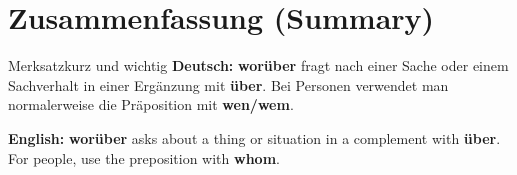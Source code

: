 \documentclass[a4paper,11pt]{article}
\newcommand{\GermanText}[1]{\textbf{Deutsch: }#1\par}
\newcommand{\EnglishText}[1]{{\small\color{SoftGray}\textbf{English: }#1\par}}
\begin{document}
\section{Zusammenfassung (Summary)}
\begin{grammarentry}{Merksatz}{kurz und wichtig}
\GermanText{\textbf{worüber} fragt nach einer Sache oder einem Sachverhalt in einer Ergänzung mit \textbf{über}. Bei Personen verwendet man normalerweise die Präposition mit \textbf{wen/wem}.}
\EnglishText{\textbf{worüber} asks about a thing or situation in a complement with \textbf{über}. For people, use the preposition with \textbf{whom}.}
\end{grammarentry}
\end{document}
